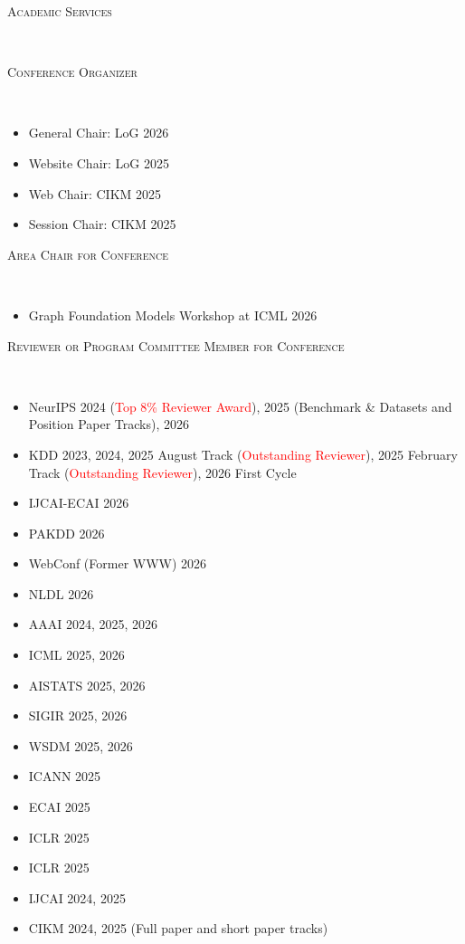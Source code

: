 \documentclass[10pt]{article}
\newenvironment{changemargin}[2]{
  \begin{list}{}{
    \setlength{\topsep}{0pt}
    \setlength{\leftmargin}{#1}
    \setlength{\rightmargin}{#2}
    \setlength{\listparindent}{\parindent}
    \setlength{\itemindent}{\parindent}
    \setlength{\parsep}{\parskip}
  }
  \item[]}{\end{list}
}
\newcommand{\lineover}{
	\begin{changemargin}{-0.05in}{-0.05in}
		\vspace*{-8pt}
		\hrulefill \\
		\vspace*{-2pt}
	\end{changemargin}
}
\newcommand{\header}[1]{
	\begin{changemargin}{-0.5in}{-0.5in}
		\scshape{#1}\\
  	\lineover
	\end{changemargin}
}
\newcommand{\RED}[1]{\textcolor{red}{#1}}
\newenvironment{body} {
	\vspace*{-16pt}
	\begin{changemargin}{-0.25in}{-0.5in}
  }
	{\end{changemargin}
}
\begin{document}
\medskip

\header{Academic Services}

\vspace{2em}
\begin{body}
    \textsc{Conference Organizer}
    \lineover
    \begin{itemize}
        \item General Chair: LoG 2026
        \item Website Chair: LoG 2025
        \item Web Chair: CIKM 2025
        \item Session Chair: CIKM 2025
    \end{itemize}
   \vspace{1em}
   \textsc{Area Chair for Conference}
    \lineover
    \begin{itemize}
        \item Graph Foundation Models Workshop at ICML 2026
    \end{itemize}
   \vspace{1em}
   \textsc{Reviewer or Program Committee Member for Conference}
    \lineover
    \begin{itemize}
        \item NeurIPS 2024 (\RED{Top 8\% Reviewer Award}), 2025 (Benchmark \& Datasets and Position Paper Tracks), 2026
        \item KDD 2023, 2024, 2025 August Track (\RED{Outstanding Reviewer}), 2025 February Track (\RED{Outstanding Reviewer}), 2026 First Cycle
        \item IJCAI-ECAI 2026
        \item PAKDD 2026
        \item WebConf (Former WWW) 2026
        \item NLDL 2026
        \item AAAI 2024, 2025, 2026
        \item ICML 2025, 2026
        \item AISTATS 2025, 2026
        \item SIGIR 2025, 2026
        \item WSDM 2025, 2026
        \item ICANN 2025
        \item ECAI 2025
        \item ICLR 2025
        \item ICLR 2025
        \item IJCAI 2024, 2025
        \item CIKM 2024, 2025 (Full paper and short paper tracks)

\end{itemize}
\end{body}
\end{document}
